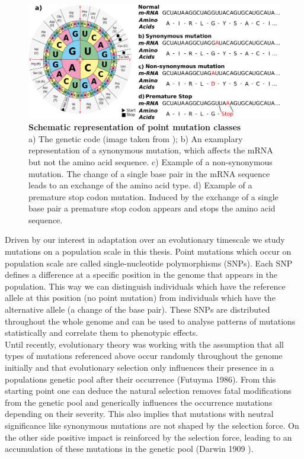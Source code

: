 \begin{figure}[tb]
    \centering
    \begin{minipage}[h]{0.9\textwidth}
      \centering
      \includegraphics[width=1\textwidth]{images/Mutations.png}
      \caption{\textbf{Schematic representation of point mutation classes}\\
      a) The genetic code (image taken from \textcite{bresch2013}); b) An examplary representation of a synonymous mutation, which affects the mRNA but not the amino acid sequence. c) Example of a non-synonymous mutation. The change of a single base pair in the mRNA sequence leads to an exchange of the amino acid type. d) Example of a premature stop codon mutation. Induced by the exchange of a single base pair a premature stop codon appears and stops the amino acid sequence.}
     \label{fig:Codons}
    \end{minipage}
  \end{figure}
Driven by our interest in adaptation over an evolutionary timescale we study mutations on a population scale in this thesis. Point mutations which occur on population scale are called single-nucleotide polymorphisms (SNPs). Each SNP defines a difference at a  specific position in the genome that appears in the population. This way we can distinguish individuals which have the reference allele at this position (no point mutation) from individuals which have the alternative allele (a change of the base pair). These SNPs are distributed throughout the whole genome and can be used to analyse patterns of mutations statistically and correlate them to phenotypic effects. \\
Until recently, evolutionary theory was working with the assumption that all types of mutations referenced above occur randomly throughout the genome initially and that evolutionary selection only influences their presence in a populations genetic pool after their occurrence (Futuyma 1986\cite{futuyma1986}). From this starting point one can deduce the natural selection removes fatal modifications from the genetic pool and generically influences the occurrence mutations depending on their severity. This also implies that mutations with neutral significance like synonymous mutations are not shaped by the selection force. On the other side positive impact is reinforced by the selection force, leading to an accumulation of these mutations in the genetic pool (Darwin 1909 \cite{darwin1909}).\\
